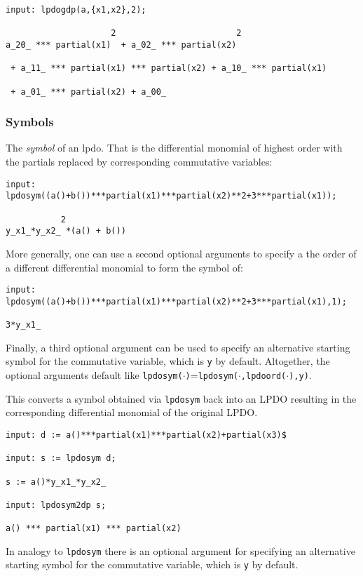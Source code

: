 \begin{footnotesize}
\begin{verbatim}
input: lpdogdp(a,{x1,x2},2);

                     2                        2
a_20_ *** partial(x1)  + a_02_ *** partial(x2)

 + a_11_ *** partial(x1) *** partial(x2) + a_10_ *** partial(x1)

 + a_01_ *** partial(x2) + a_00_
\end{verbatim}
\end{footnotesize}

\subsubsection{Symbols}
The \emph{symbol} of an lpdo. That is the differential monomial of
highest order with the partials replaced by corresponding commutative
variables:

\begin{footnotesize}
\begin{verbatim}
input: lpdosym((a()+b())***partial(x1)***partial(x2)**2+3***partial(x1));

           2
y_x1_*y_x2_ *(a() + b())
\end{verbatim}
\end{footnotesize}
More generally, one can use a second optional arguments to specify a
the order of a different differential monomial to form the symbol of:

\begin{footnotesize}
\begin{verbatim}
input: lpdosym((a()+b())***partial(x1)***partial(x2)**2+3***partial(x1),1);

3*y_x1_
\end{verbatim}
\end{footnotesize}
Finally, a third optional argument can be used to specify an
alternative starting symbol for the commutative variable, which is
\texttt{y} by default. Altogether, the optional arguments default like
\texttt{lpdosym($\cdot$)}=\texttt{lpdosym($\cdot$,lpdoord($\cdot$),y)}.

This converts a symbol obtained via \texttt{lpdosym} back into an LPDO
resulting in the corresponding differential monomial of the original
LPDO.

\begin{footnotesize}
\begin{verbatim}
input: d := a()***partial(x1)***partial(x2)+partial(x3)$

input: s := lpdosym d;

s := a()*y_x1_*y_x2_

input: lpdosym2dp s;

a() *** partial(x1) *** partial(x2)
\end{verbatim}
\end{footnotesize}
In analogy to \texttt{lpdosym} there is an optional argument for
specifying an alternative starting symbol for the commutative
variable, which is \texttt{y} by default.

